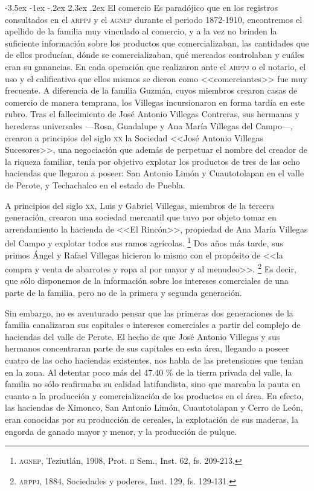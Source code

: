 \documentclass[14pt,twoside,final]{extbook} %
\makeatletter
\let\oldfootnote\footnote
\renewcommand\footnote[1]{%
\oldfootnote{\hspace{1mm}#1}}
\renewcommand\section{\@startsection {section}{1}{\z@}%
                                     {-3.5ex \@plus -1ex \@minus -.2ex}%
                                     {2.3ex \@plus .2ex}%
                                     {\normalfont\large\bfseries\sc}}
\makeatother
\begin{document}
\section{El comercio}\label{sec:el-comercio}
Es paradójico que en los registros consultados en el \textsc{arppj} y el \textsc{agnep} durante el
periodo 1872-1910, encontremos el apellido de la familia muy vinculado al comercio, y a la vez no brinden la suficiente información sobre los productos que comercializaban, las cantidades que de ellos producían, dónde se comercializaban, qué mercados controlaban y cuáles eran su ganancias. En cada operación que realizaron ante el \textsc{arppj} o el notario, el uso y el calificativo que ellos mismos se dieron como <<comerciantes>> fue muy frecuente. A diferencia de la familia Guzmán, cuyos miembros crearon casas de comercio de manera temprana, los Villegas incursionaron en forma tardía en este rubro. Tras el fallecimiento de José Antonio Villegas Contreras, sus hermanas y herederas universales ---Rosa, Guadalupe y Ana María Villegas del Campo---, crearon a principios del siglo \textsc{xx} la Sociedad <<José Antonio Villegas Sucesores>>, una negociación que además de perpetuar el nombre del creador de la riqueza familiar, tenía por objetivo explotar los productos de tres de las ocho haciendas que llegaron a poseer: San Antonio Limón y Cuautotolapan en el valle de Perote, y Techachalco en el estado de Puebla.

A principios del siglo \textsc{xx}, Luis y Gabriel Villegas, miembros de la tercera generación, crearon una sociedad mercantil que tuvo por objeto tomar en arrendamiento la hacienda de <<El Rincón>>, propiedad de Ana María Villegas del Campo y explotar todos sus ramos agrícolas.\footnote{\textsc{agnep}, Teziutlán, 1908, Prot. \textsc{ii} Sem., Inst. 62, fs. 209-213.} Dos años más tarde, sus primos Ángel y Rafael Villegas hicieron lo mismo con el propósito de <<la compra y venta de abarrotes y ropa al por mayor y al menudeo>>.\footnote{\textsc{arppj}, 1884, Sociedades y poderes, Inst. 129, fs. 129-131.} Es decir, que sólo disponemos de la información sobre los intereses comerciales de una parte de la familia, pero no de la primera y segunda generación.

Sin embargo, no es aventurado pensar que las primeras dos generaciones de la familia canalizaran sus capitales e intereses comerciales a partir del complejo de haciendas del valle de Perote. El hecho de que José Antonio Villegas y sus hermanos concentraran parte de sus capitales en esta área, llegando a poseer cuatro de las ocho haciendas existentes, nos habla de las pretensiones que tenían en la zona. Al detentar poco más del 47.40 \% de la tierra privada del valle, la familia no sólo reafirmaba su
calidad latifundista, sino que marcaba la pauta en cuanto a la producción y comercialización de los productos en el área. En efecto, las haciendas de Ximonco, San Antonio Limón, Cuautotolapan y Cerro de León, eran conocidas por su producción de cereales, la explotación de sus maderas, la engorda de ganado mayor y menor, y la producción de pulque.
\end{document}
